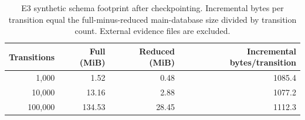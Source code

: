 \begin{table}[htbp]
\centering
\small
\caption{E3 synthetic schema footprint after checkpointing. Incremental bytes per transition equal the full-minus-reduced main-database size divided by transition count. External evidence files are excluded.}
\label{tab:storage-cost}
\begin{tabular}{@{}rrrr@{}}
\toprule
Transitions & Full (MiB) & Reduced (MiB) & Incremental bytes/transition \\
\midrule
1,000 & 1.52 & 0.48 & 1085.4 \\
10,000 & 13.16 & 2.88 & 1077.2 \\
100,000 & 134.53 & 28.45 & 1112.3 \\
\bottomrule
\end{tabular}
\end{table}
